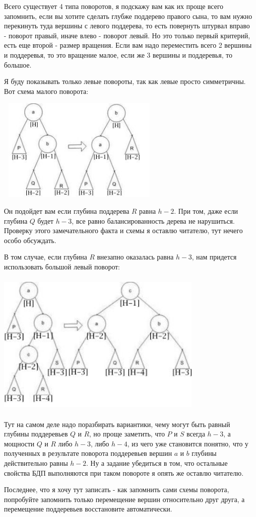 Всего существует 4 типа поворотов, я подскажу вам как их проще всего запомнить, если вы хотите сделать глубже поддерево правого сына, то вам нужно перекинуть туда вершины с левого поддерева, то есть повернуть штурвал вправо - поворот правый, иначе влево - поворот левый. Но это только первый критерий, есть еще второй - размер вращения. Если вам надо переместить всего 2 вершины и поддеревья, то это вращение малое, если же 3 вершины и поддеревья, то большое.

Я буду показывать только левые повороты, так как левые просто симметричны. Вот схема малого поворота:
\begin{center}
    \includegraphics[width=8cm, height=5cm]{assets/avl_balance1.jpg}
\end{center}
Он подойдет вам если глубина поддерева $R$ равна $h-2$. При том, даже если глубина $Q$ будет $h-3$, все равно балансированность дерева не нарушиться. Проверку этого замечательного факта и схемы я оставлю читателю, тут нечего особо обсуждать.
 
В том случае, если глубина $R$ внезапно оказалась равна $h-3$, нам придется использовать большой левый поворот:
\begin{center}
    \includegraphics[width=10cm, height=7cm]{assets/avl_balance2.jpg}
\end{center}

Тут на самом деле надо поразбирать вариантики, чему могут быть равный глубины поддеревьев $Q$ и $R$, но проще заметить, что $P$ и $S$ всегда $h-3$, а мощности $Q$ и $R$ либо $h-3$, либо $h-4$, из чего уже становится понятно, что у полученных в результате поворота поддеревьев вершин $a$ и $b$ глубины действительно равны $h-2$. Ну а задание убедиться в том, что остальные свойства БДП выполняются при таком повороте я опять же оставлю читателю.

Последнее, что я хочу тут записать - как запомнить сами схемы поворота, попробуйте запомнить только перемещение вершин относительно друг друга, а перемещение поддеревьев восстановите автоматически.